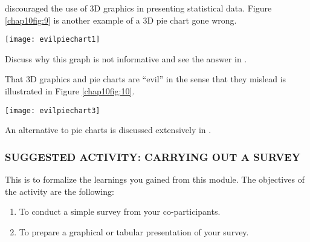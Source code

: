 \begin{example}
\begin{Quote}
\end{Quote}
\item \textcite[Section 7.6, pages 88--89]{tantau} discouraged the use of 3D graphics in presenting statistical data. Figure \eqref{chap10fig:9} is another example of a 3D pie chart gone wrong.

\begin{center}
\texttt{[image: evilpiechart1]}
\label{chap10fig:9}
\end{center}

Discuss why this graph is not informative and see the answer in \textcite[pages 88--89]{tantau}.
\item That 3D graphics and pie charts are ``evil'' in the sense that they mislead is illustrated in Figure \eqref{chap10fig:10}.

\begin{center}
\texttt{[image: evilpiechart3]}
\label{chap10fig:10}
\end{center}

An alternative to pie charts is discussed extensively in \textcite{few}.
\end{example}

\subsubsection*{SUGGESTED ACTIVITY: CARRYING OUT A SURVEY}
This is to formalize the learnings you gained from this module. The objectives of
the activity are the following:
\begin{enumerate}
\item To conduct a simple survey from your co-participants.
\item To prepare a graphical or tabular presentation of your survey.
\end{enumerate}

